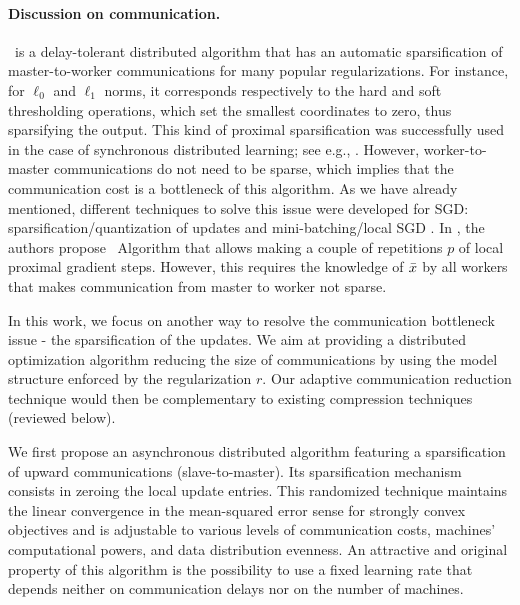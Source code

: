 {\color{blue}
\paragraph{Discussion on communication.}
\dave~is a delay-tolerant distributed algorithm that has an automatic sparsification of master-to-worker communications for many popular regularizations. For instance, for $\ell_0$ and $\ell_1$ norms, it corresponds respectively to the hard and soft thresholding operations, which set the smallest coordinates to zero, thus sparsifying the output. This kind of proximal sparsification was successfully used in the case of synchronous distributed learning; see e.g., \cite{wang2017efficient,smith2015l1}. However, worker-to-master communications do not need to be sparse, which implies that the communication cost is a bottleneck of this algorithm. As we have already mentioned, different techniques to solve this issue were developed for SGD: sparsification/quantization of updates \cite{horvath2019stochastic} and mini-batching/local SGD \cite{yang2013trading, khaled2019first}. In \cite{mishchenko2018,ICML18}, the authors propose \daveR~Algorithm that allows making a couple of repetitions $p$ of local proximal gradient steps. However, this requires the knowledge of $\bar{x}$ by all workers that makes communication from master to worker not sparse.

In this work, we focus on another way to resolve the communication bottleneck issue - the sparsification of the updates. We aim at providing a distributed optimization algorithm reducing the size of communications by using the model structure enforced by the regularization $r$. Our adaptive communication reduction technique would then be complementary to existing compression techniques (reviewed below).

We first propose an asynchronous distributed algorithm featuring a sparsification of upward communications (slave-to-master). Its sparsification mechanism consists in {\color{red}{randomly and independly}} zeroing the local update entries. This randomized technique maintains the linear convergence in the mean-squared error sense for strongly convex objectives {\color{red}{when difference in probabilities of coordinates to be selected is small enough}} and is adjustable to various levels of communication costs, machines' computational powers, and data distribution evenness. An attractive and original property of this algorithm is the possibility to use a fixed learning rate that depends neither on communication delays nor on the number of machines.

}
